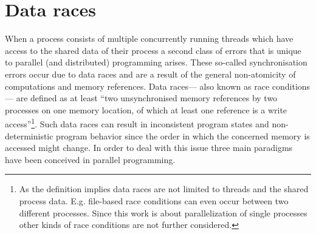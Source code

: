 \section{Data races}
When a process consists of multiple concurrently running threads which have access to the shared data of their process a second class of errors that is unique to parallel (and distributed) programming arises. These so-called synchronisation errors occur due to data races and are a result of the general non-atomicity of computations and memory references. Data races--- also known as race conditions--- are defined as at least ``two unsynchronised memory references by two processes on one memory location, of which at least one reference is a write access''\cite[p.~327]{ParallelComputing}\footnote{As the definition implies data races are not limited to threads and the shared process data. E.g. file-based race conditions can even occur between two different processes\cite{OfficialISC2Guide}. Since this work is about parallelization of single processes other kinds of race conditions are not further considered.}. Such data races can result in inconsistent program states and non-deterministic program behavior since the order in which the concerned memory is accessed might change. In order to deal with this issue three main paradigms have been conceived in parallel programming.

